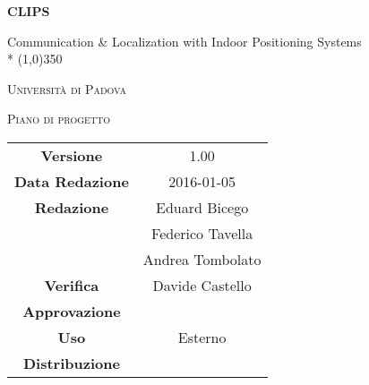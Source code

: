 \documentclass[a4paper,12pt]{article}
\author{Eduard Bicego, Federico Tavella, Andrea Tombolato}
\date{05/01/2016}
\begin{document}
	\begin{titlepage}
		\centering
		{\huge\bfseries CLIPS\par}
		Communication \& Localization with Indoor Positioning Systems \\*
		\line(1,0){350} \\
		{\scshape\LARGE Università di Padova \par}
		\vspace{1cm}
		{\scshape\Large Piano di progetto\par}
		\vspace{2cm}
		\logo
	
		\vfill \vfill
		\begin{tabular}{c|c}
			{\hfill \textbf{Versione}} 			& 1.00				\\
			{\hfill\textbf{Data Redazione}} 	& 2016-01-05  		\\
			{\hfill\textbf{Redazione}} 			& Eduard Bicego  	\\ 
												& Federico Tavella	\\
												& Andrea Tombolato	\\
			{\hfill\textbf{Verifica}} 			& Davide Castello 	\\
			{\hfill\textbf{Approvazione}} 		&  					\\
			{\hfill\textbf{Uso}} 				& Esterno			\\
			{\hfill\textbf{Distribuzione}} 		& \leaf				\\
	\end{tabular}
\end{titlepage}
	
	\newpage
		
	\newpage
		\tableofcontents 	%
	\newpage
		\listoftables 		%
	\newpage	
		\listoffigures		%
	
	\label{LastFrontPage}

	\newpage
		\pagestyle{mymain}
	
	\newpage
		
	\newpage
		

	\newpage
		
		
	\newpage
		
		
	\newpage
			
		
	\newpage
			

    \newpage
		
		
	\newpage
		
        
    \newpage
		
		
	\label{LastPage}
\end{document}
